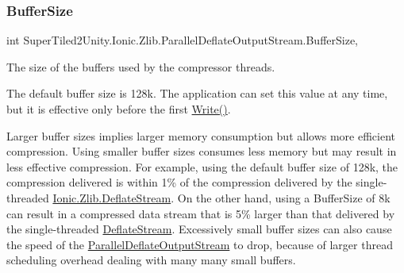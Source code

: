 \subsubsection{\texorpdfstring{Buffer\+Size}{BufferSize}}
{\footnotesize\ttfamily int Super\+Tiled2\+Unity.\+Ionic.\+Zlib.\+Parallel\+Deflate\+Output\+Stream.\+Buffer\+Size\hspace{0.3cm}{\ttfamily [get]}, {\ttfamily [set]}}



The size of the buffers used by the compressor threads. 

The default buffer size is 128k. The application can set this value at any time, but it is effective only before the first \mbox{\hyperlink{class_super_tiled2_unity_1_1_ionic_1_1_zlib_1_1_parallel_deflate_output_stream_a806d2664ad5782928882e0c1eab34616}{Write()}}. 

Larger buffer sizes implies larger memory consumption but allows more efficient compression. Using smaller buffer sizes consumes less memory but may result in less effective compression. For example, using the default buffer size of 128k, the compression delivered is within 1\% of the compression delivered by the single-\/threaded \mbox{\hyperlink{class_super_tiled2_unity_1_1_ionic_1_1_zlib_1_1_deflate_stream}{Ionic.\+Zlib.\+Deflate\+Stream}}. On the other hand, using a Buffer\+Size of 8k can result in a compressed data stream that is 5\% larger than that delivered by the single-\/threaded {\ttfamily \mbox{\hyperlink{class_super_tiled2_unity_1_1_ionic_1_1_zlib_1_1_deflate_stream}{Deflate\+Stream}}}. Excessively small buffer sizes can also cause the speed of the \mbox{\hyperlink{class_super_tiled2_unity_1_1_ionic_1_1_zlib_1_1_parallel_deflate_output_stream}{Parallel\+Deflate\+Output\+Stream}} to drop, because of larger thread scheduling overhead dealing with many many small buffers. 

